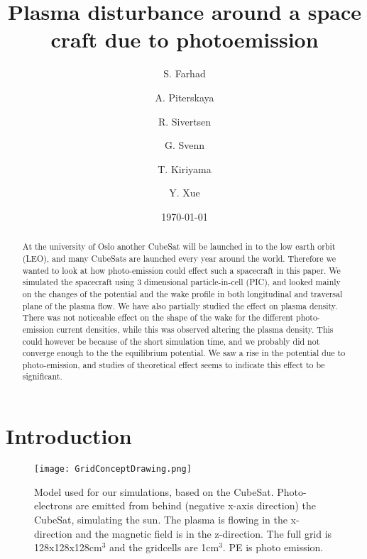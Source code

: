 \documentclass[aip, 
rsi, 
amsmath,
amssymb,
longbibliography,
reprint]{revtex4-1}
\begin{document}
\title[4th 4DSpace Workshop -- Team Godzilla -- Final Report]{Plasma disturbance around a space craft due to photoemission}

\author{S. Farhad} 
\author{A. Piterskaya}
\author{R. Sivertsen}
\author{G. Svenn}

\author{T. Kiriyama}
\author{Y. Xue}

\date{\today}

\begin{abstract}
At the university of Oslo another CubeSat will be launched in to the low earth orbit (LEO), and many CubeSats are launched every year around the world. Therefore we wanted to look at how photo-emission could effect such a spacecraft in this paper. We simulated the spacecraft using 3 dimensional particle-in-cell (PIC), and looked mainly on the changes of the potential and the wake profile in both longitudinal and traversal plane of the plasma flow. We have also partially studied the effect on plasma density.\\ 

There was not noticeable effect on the shape of the wake for the different photo-emission current densities, while this was observed altering the plasma density. This could however be because of the short simulation time, and we probably did not converge enough to the the equilibrium potential. We saw a rise in the potential due to photo-emission, and studies of theoretical effect seems to indicate this effect to be significant. 
\end{abstract}

\maketitle

\section{\label{sec:intro} Introduction}

\begin{figure*}[!ht]
\texttt{[image: GridConceptDrawing.png]}
\caption{Model used for our simulations, based on the CubeSat. Photo-electrons are emitted from behind (negative x-axis direction) the CubeSat, simulating the sun. The plasma is flowing in the x-direction and the magnetic field is in the z-direction. The full grid is 128x128x128cm$^3$ and the gridcells are 1cm$^3$. PE is photo emission.\label{fig:model}}
\end{figure*}
\end{document}
